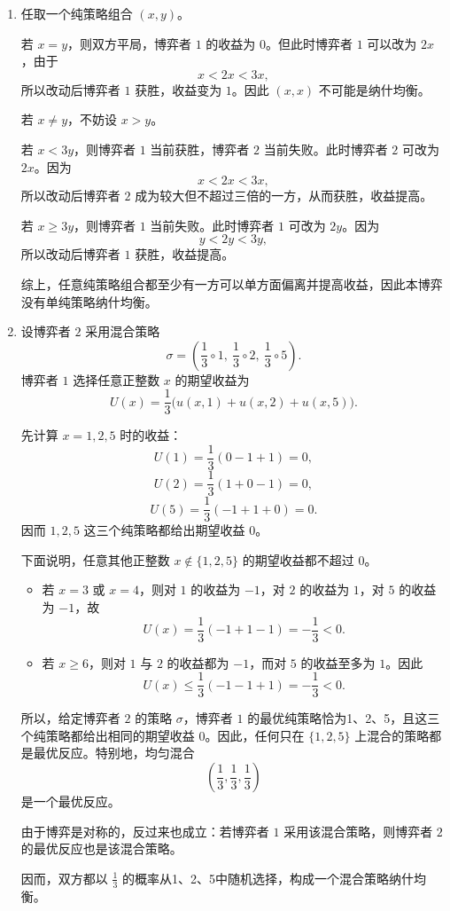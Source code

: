 \documentclass[12pt,a4paper]{article}
\begin{document}
\begin{enumerate}[label=\alph*.]
  \item 任取一个纯策略组合 \((x,y)\)。

  若 \(x=y\)，则双方平局，博弈者 \(1\) 的收益为 \(0\)。但此时博弈者 \(1\) 可以改为 \(2x\)，由于
  \[
    x<2x<3x,
  \]
  所以改动后博弈者 \(1\) 获胜，收益变为 \(1\)。因此 \((x,x)\) 不可能是纳什均衡。

  若 \(x\ne y\)，不妨设 \(x>y\)。
  
  若 \(x<3y\)，则博弈者 \(1\) 当前获胜，博弈者 \(2\) 当前失败。此时博弈者 \(2\) 可改为 \(2x\)。因为
  \[
    x<2x<3x,
  \]
  所以改动后博弈者 \(2\) 成为较大但不超过三倍的一方，从而获胜，收益提高。

  若 \(x\ge 3y\)，则博弈者 \(1\) 当前失败。此时博弈者 \(1\) 可改为 \(2y\)。因为
  \[
    y<2y<3y,
  \]
  所以改动后博弈者 \(1\) 获胜，收益提高。

  综上，任意纯策略组合都至少有一方可以单方面偏离并提高收益，因此本博弈没有单纯策略纳什均衡。

  \item 设博弈者 \(2\) 采用混合策略
  \[
    \sigma=\left(\frac{1}{3} \circ 1,\ \frac13 \circ 2,\ \frac13 \circ 5\right).
  \]
  博弈者 \(1\) 选择任意正整数 \(x\) 的期望收益为
  \[
    U(x)=\frac13\bigl(u(x,1)+u(x,2)+u(x,5)\bigr).
  \]

  先计算 \(x=1,2,5\) 时的收益：
  \[
    U(1)=\frac13(0-1+1)=0,
  \]
  \[
    U(2)=\frac13(1+0-1)=0,
  \]
  \[
    U(5)=\frac13(-1+1+0)=0.
  \]
  因而 \(1,2,5\) 这三个纯策略都给出期望收益 \(0\)。

  下面说明，任意其他正整数 \(x\notin\{1,2,5\}\) 的期望收益都不超过 \(0\)。

  \begin{itemize}
    \item 若 \(x=3\) 或 \(x=4\)，则对 \(1\) 的收益为 \(-1\)，对 \(2\) 的收益为 \(1\)，对 \(5\) 的收益为 \(-1\)，故
    \[
      U(x)=\frac13(-1+1-1)=-\frac13<0.
    \]

    \item 若 \(x\ge 6\)，则对 \(1\) 与 \(2\) 的收益都为 \(-1\)，而对 \(5\) 的收益至多为 \(1\)。因此
    \[
      U(x)\le \frac13(-1-1+1)=-\frac13<0.
    \]
  \end{itemize}

  所以，给定博弈者 \(2\) 的策略 \(\sigma\)，博弈者 \(1\) 的最优纯策略恰为1、2、5，且这三个纯策略都给出相同的期望收益 \(0\)。因此，任何只在 \(\{1,2,5\}\) 上混合的策略都是最优反应。特别地，均匀混合
  \[
    \left(\frac13,\frac13,\frac13\right)
  \]
  是一个最优反应。

  由于博弈是对称的，反过来也成立：若博弈者 \(1\) 采用该混合策略，则博弈者 \(2\) 的最优反应也是该混合策略。

  因而，双方都以 \(\frac13\) 的概率从1、2、5中随机选择，构成一个混合策略纳什均衡。

\end{enumerate}

\end{document}
